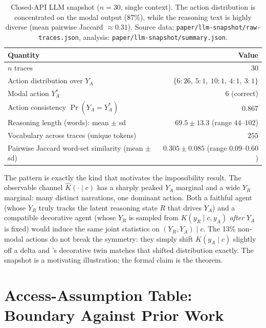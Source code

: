 \documentclass{article}
\theoremstyle{plain}
\theoremstyle{definition}
\theoremstyle{remark}
\begin{document}
\begin{table}[h]
\centering\small
\begin{tabular}{lr}
\toprule
Quantity & Value \\
\midrule
$n$ traces & $30$ \\
Action distribution over $Y_A$ &
  $\{6\!:\!26,\ 5\!:\!1,\ 10\!:\!1,\ 4\!:\!1,\ 3\!:\!1\}$ \\
Modal action $Y_A^*$ & $6$ (correct) \\
Action consistency $\Pr(Y_A = Y_A^*)$ & $0.867$ \\
Reasoning length (words): mean $\pm$ sd & $69.5 \pm 13.3$ (range $44$--$102$) \\
Vocabulary across traces (unique tokens) & $255$ \\
Pairwise Jaccard word-set similarity (mean $\pm$ sd) & $0.305 \pm 0.085$ (range $0.09$--$0.60$) \\
\bottomrule
\end{tabular}
\caption{Closed-API LLM snapshot ($n=30$, single context). The action
distribution is concentrated on the modal output ($87\%$), while the
reasoning text is highly diverse (mean pairwise Jaccard
$\approx 0.31$). Source data: \texttt{paper/llm-snapshot/raw-traces.json},
analysis: \texttt{paper/llm-snapshot/summary.json}.}
\label{tab:llm-snapshot}
\end{table}

The pattern is exactly the kind that motivates the impossibility result. The
observable channel $\hat K(\cdot \mid c)$ has a sharply peaked $Y_A$ marginal
and a wide $Y_R$ marginal: many distinct narrations, one dominant action.
Both a faithful agent (whose $Y_R$ truly tracks the latent reasoning state
$R$ that drives $Y_A$) and a compatible decorative agent (whose $Y_R$ is
sampled from $K(y_R \mid c, y_A)$ \emph{after} $Y_A$ is fixed) would induce
the same joint statistics on $(Y_R, Y_A) \mid c$. The 13\% non-modal actions
do not break the symmetry: they simply shift $K(y_A \mid c)$ slightly off a
delta and 's decorative twin matches that
shifted distribution exactly. The snapshot is a motivating illustration; the
formal claim is the theorem.

\section{Access-Assumption Table: Boundary Against Prior Work}\label{sec:access-table}
\end{document}
